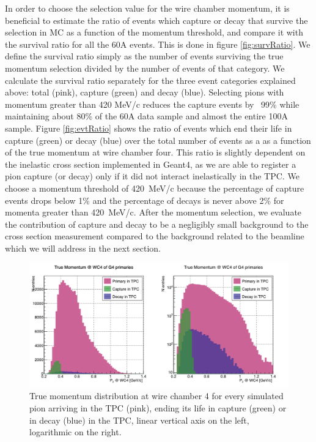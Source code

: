 In order to choose the selection value for the wire chamber momentum, it is beneficial to estimate the ratio of events which capture or decay that survive the selection in MC as a function of the momentum threshold, and compare it with the survival ratio for all the 60A events. This is done in figure \ref{fig:survRatio}. We define the survival ratio simply  as the number of events surviving the true momentum selection divided by the number of events of that category. We calculate the survival ratio separately for the three event categories explained above: total (pink), capture (green) and decay (blue).
Selecting pions with momentum greater than 420 MeV/c reduces the capture events by ~99\% while maintaining about 80\% of the 60A data sample and almost the entire 100A sample. 
Figure \ref{fig:evtRatio} shows the ratio of events which end their life in capture (green) or decay (blue) over the total number of events as a as a function of the true momentum at wire chamber four. This ratio is slightly dependent on the inelastic cross section implemented in Geant4, as we are able to register a pion capture (or decay) only if it did not interact inelastically in the TPC. We choose a momentum threshold of 420~MeV/c because the percentage of capture events drops below 1\% and the percentage of decays is never above 2\% for momenta greater than 420~MeV/c. After the momentum selection, we evaluate the contribution of capture and decay to be a negligibly small background to the cross section measurement compared to the background related to the beamline which we will address in the next section.

\begin{figure}[]
\centering
\includegraphics[width=15cm]{Chapter-7/Images/CDAsMomentumFunct.png}
\caption{True momentum distribution at wire chamber 4 for every simulated pion arriving in the TPC (pink), ending its life in capture (green) or in decay (blue) in the TPC, linear vertical axis on the left, logarithmic on the right. }
\label{fig:CaptureMom}
\end{figure}

